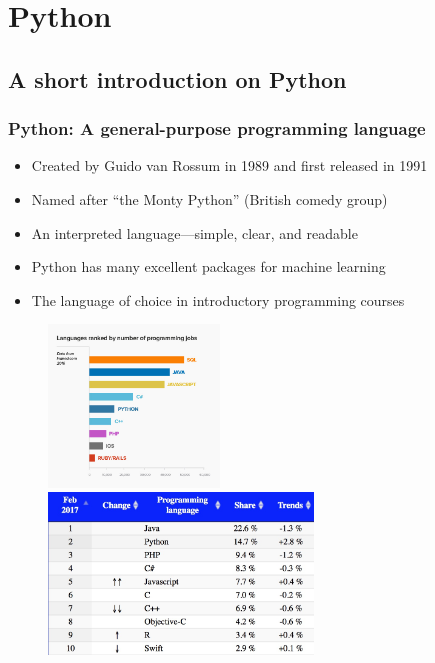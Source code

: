
\section{Python}\label{sec:python}

\subsection{A short introduction on Python}

\begin{frame}
  \MyLogo
  \frametitle{Python: A general-purpose programming language}  

\small 

\begin{itemize}

\item Created by Guido van Rossum in 1989 and first released in 1991

\item Named after ``the Monty Python'' (British comedy group)

\item An interpreted language---simple, clear, and readable 

\item Python has many excellent packages for machine learning

\item The language of choice in introductory programming courses

\end{itemize}

\begin{figure}[htbp] %
   \includegraphics[height=1.7in]{figures/ComputerLanguagesDemand.jpg} 
   \includegraphics[height=1.7in]{figures/ComputerLanguagesShare.jpg} 
\end{figure}

\end{frame}

